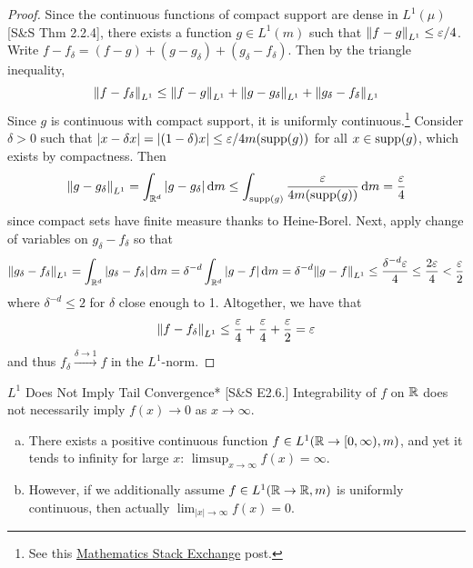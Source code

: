 \begin{proof}
    Since the continuous functions of compact support are dense in \(L^1(\mu)\) [S\&S Thm 2.2.4], there exists a function \(g \in L^1(m)\) such that \(\norm{f - g}_{L^1} \leq \varepsilon / 4\). Write \(f - f_{\delta} = (f-g) + (g-g_{\delta}) + (g_{\delta} - f_{\delta})\). Then by the triangle inequality, 
    \[
    \norm{f - f_{\delta}}_{L^1} \leq \norm{f - g}_{L^1} + \norm{g - g_{\delta}}_{L^1} + \norm{g_{\delta} - f_{\delta}}_{L^1}
    \]
    Since \(g\) is continuous with compact support, it is uniformly continuous.\footnote{See this \href{https://math.stackexchange.com/questions/2086124/continuous-with-compact-support-implies-uniform-continuity}{Mathematics Stack Exchange} post.} Consider \(\delta > 0\) such that \(|x - \delta x| = |(1 - \delta)x| \leq \varepsilon / 4 m(\operatorname{supp}(g))\) for all \(x \in \operatorname{supp}(g)\), which exists by compactness. Then 
    \[
    \norm{g - g_{\delta}}_{L^1} 
    = \int_{\mathbb{R}^d} |g - g_{\delta}| \, \mathrm{d}m
    \leq \int_{\operatorname{supp}(g)} \frac{\varepsilon}{4 m(\operatorname{supp}(g))} \, \mathrm{d}m
    = \frac{\varepsilon}{4}
    \]
    since compact sets have finite measure thanks to Heine-Borel. Next, apply change of variables on \(g_{\delta} - f_{\delta}\) so that  
    \[
    \norm{g_{\delta} - f_{\delta}}_{L^1}
    = \int_{\mathbb{R}^d} |g_{\delta} - f_{\delta}| \, \mathrm{d}m
    = \delta^{-d} \int_{\mathbb{R}^d} |g - f| \, \mathrm{d}m
    = \delta^{-d} \norm{g - f}_{L^1}
    \leq \frac{\delta^{-d} \varepsilon}{4}
    \leq \frac{2\varepsilon}{4}
    < \frac{\varepsilon}{2}
    \]
    where \(\delta^{-d} \leq 2\) for \(\delta\) close enough to 1. Altogether, we have that 
    \[
        \norm{f - f_{\delta}}_{L^1} \leq \frac{\varepsilon}{4} + \frac{\varepsilon}{4} + \frac{\varepsilon}{2}
        = \varepsilon
    \]
    and thus \(f_\delta \stackrel{\delta \to 1}{\longrightarrow} f\) in the \(L^1\)-norm. 
\end{proof}

\begin{problem}{\(L^1\) Does Not Imply Tail Convergence}*
    [S\&S E2.6.] Integrability of \(f\) on \(\mathbb{R}\) does not necessarily imply \(f(x) \to 0\) as \(x \to \infty\). 
    \begin{enumerate}[(a)]
        \item There exists a positive continuous function \(f \in L^1(\mathbb{R} \to [0, \infty), m)\), and yet it tends to infinity for large \(x\): \(\limsup_{x \to \infty} f(x) = \infty\). 
        \item However, if we additionally assume \(f \in L^1(\mathbb{R} \to \mathbb{R}, m)\) is uniformly continuous, then actually \(\lim_{|x| \to \infty} f(x) = 0\). 
    \end{enumerate}
\end{problem}


